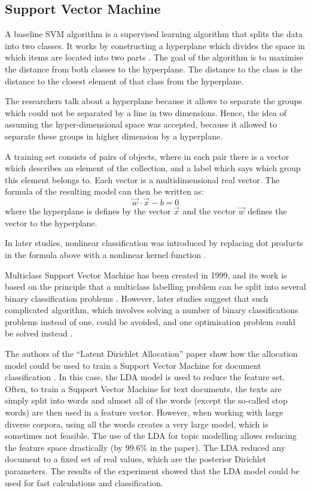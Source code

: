 \subsection{Support Vector Machine}
    A baseline SVM algorithm is a supervised learning algorithm that splits the data into two classes. It works by constructing a hyperplane which divides the space in which items are located into two parts \cite{vapnik1963pattern}. The goal of the algorithm is to maximise the distance from both classes to the hyperplane. The distance to the class is the distance to the closest element of that class from the hyperplane.
    
    The researchers talk about a hyperplane because it allows to separate the groups which could not be separated by a line in two dimensions. Hence, the idea of assuming the hyper-dimensional space was accepted, because it allowed to separate these groups in higher dimension by a hyperplane.
    
    A training set consists of pairs of objects, where in each pair there is a vector which describes an element of the collection, and a label which says which group this element belongs to. Each vector is a multidimensional real vector. The formula of the resulting model can then be written as:
    $$ \vec{w}^{}\cdotp\vec{x}^{}-b=0 $$
    where the hyperplane is defines by the vector $\vec{x}^{}$ and the vector $\vec{w}^{}$ defines the vector to the hyperplane.
    
    In later studies, nonlinear classification was introduced by replacing dot products in the formula above with a nonlinear kernel function \cite{boser1992training}.
    
    Multiclass Support Vector Machine has been created in 1999, and its work is based on the principle that a multiclass labelling problem can be split into several binary classification problems \cite{platt1999large}. However, later studies suggest that such complicated algorithm, which involves solving a number of binary classifications problems instead of one, could be avoided, and one optimisation problem could be solved instead \cite{crammer2001algorithmic}. 
    
    The authors of the ``Latent Dirichlet Allocation'' paper show how the allocation model could be used to train a Support Vector Machine for document classification \cite{blei2003latent}. In this case, the LDA model is used to reduce the feature set. Often, to train a Support Vector Machine for text documents, the texts are simply split into words and almost all of the words (except the so-called stop words) are then used in a feature vector. However, when working with large diverse corpora, using all the words creates a very large model, which is sometimes not feasible. The use of the LDA for topic modelling allows reducing the feature space drastically (by 99.6\% in the paper). The LDA reduced any document to a fixed set of real values, which are the posterior Dirichlet parameters. The results of the experiment showed that the LDA model could be used for fast calculations and classification. 


